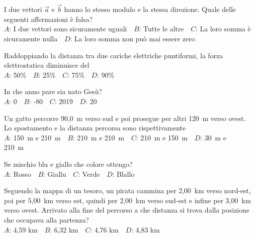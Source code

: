 \def\mcquestionnumber{7}


\mcquestionheader I due vettori $\vec{a}$ e $\vec{b}$ hanno lo stesso modulo e la stessa direzione. Quale delle seguenti affermazioni è falsa?\\
{$A$}: I due vettori sono sicuramente uguali\ \ {$B$}: Tutte le altre\ \ {$C$}: La loro somma è sicuramente nulla\ \ {$D$}: La loro somma non può mai essere zero\ \ 

\mcquestionfooter



\def\mcquestionnumber{8}


\mcquestionheader Raddoppiando la distanza tra due cariche elettriche puntiformi, la forza elettrostatica diminuisce del\\
{$A$}: 50\%\ \ {$B$}: 25\%\ \ {$C$}: 75\%\ \ {$D$}: 90\%\ \ 

\mcquestionfooter



\def\mcquestionnumber{9}


\mcquestionheader In che anno pare sia nato Gesù?\\
{$A$}: 0\ \ {$B$}: -80\ \ {$C$}: 2019\ \ {$D$}: 20\ \ 

\mcquestionfooter



\def\mcquestionnumber{10}


\mcquestionheader Un gatto percorre 90,0~m verso sud e poi prosegue per altri 120~m verso ovest. Lo spostamento e la distanza percorsa sono rispettivamente\\
{$A$}: 150~m e 210~m\ \ {$B$}: 210~m e 210~m\ \ {$C$}: 210~m e 150~m\ \ {$D$}: 30~m e 210~m\ \ 

\mcquestionfooter



\def\mcquestionnumber{11}


\mcquestionheader Se mischio blu e giallo che colore ottengo?\\
{$A$}: Rosso\ \ {$B$}: Giallu\ \ {$C$}: Verde\ \ {$D$}: Blallo\ \ 

\mcquestionfooter



\def\mcquestionnumber{12}


\mcquestionheader Seguendo la mappa di un tesoro, un pirata cammina per 2,00~km verso nord-est, poi per 5,00~km verso est, quindi per 2,00~km verso sud-est e infine per 3,00~km verso ovest. Arrivato alla fine del percorso a che distanza si trova dalla posizione che occupava alla partenza?\\
{$A$}: 4,59 km\ \ {$B$}: 6,32 km\ \ {$C$}: 4,76 km\ \ {$D$}: 4,83 km\ \ 

